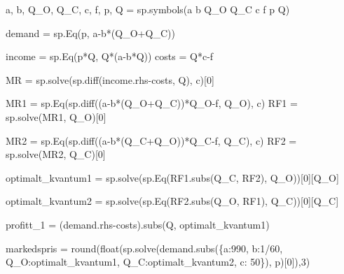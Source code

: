 \documentclass[
  12pt,
  a4paper,
  DIV=11,
  numbers=noendperiod]{scrartcl}
\newenvironment{Shaded}{\begin{snugshade}}{\end{snugshade}}
\newcommand{\BuiltInTok}[1]{\textcolor[rgb]{0.00,0.23,0.31}{#1}}
\newcommand{\DecValTok}[1]{\textcolor[rgb]{0.68,0.00,0.00}{#1}}
\newcommand{\NormalTok}[1]{\textcolor[rgb]{0.00,0.23,0.31}{#1}}
\newcommand{\OperatorTok}[1]{\textcolor[rgb]{0.37,0.37,0.37}{#1}}
\newcommand{\StringTok}[1]{\textcolor[rgb]{0.13,0.47,0.30}{#1}}
\begin{document}
\begin{Shaded}
\begin{Highlighting}[]
\NormalTok{a, b, Q\_O, Q\_C, c, f, p, Q }\OperatorTok{=}\NormalTok{ sp.symbols(}\StringTok{\textquotesingle{}a b Q\_O Q\_C c f p Q\textquotesingle{}}\NormalTok{)}

\NormalTok{demand }\OperatorTok{=}\NormalTok{ sp.Eq(p, a}\OperatorTok{{-}}\NormalTok{b}\OperatorTok{*}\NormalTok{(Q\_O}\OperatorTok{+}\NormalTok{Q\_C))}

\NormalTok{income }\OperatorTok{=}\NormalTok{ sp.Eq(p}\OperatorTok{*}\NormalTok{Q, Q}\OperatorTok{*}\NormalTok{(a}\OperatorTok{{-}}\NormalTok{b}\OperatorTok{*}\NormalTok{Q))}
\NormalTok{costs }\OperatorTok{=}\NormalTok{ Q}\OperatorTok{*}\NormalTok{c}\OperatorTok{{-}}\NormalTok{f}

\NormalTok{MR }\OperatorTok{=}\NormalTok{ sp.solve(sp.diff(income.rhs}\OperatorTok{{-}}\NormalTok{costs, Q), c)[}\DecValTok{0}\NormalTok{]}

\NormalTok{MR1 }\OperatorTok{=}\NormalTok{ sp.Eq(sp.diff((a}\OperatorTok{{-}}\NormalTok{b}\OperatorTok{*}\NormalTok{(Q\_O}\OperatorTok{+}\NormalTok{Q\_C))}\OperatorTok{*}\NormalTok{Q\_O}\OperatorTok{{-}}\NormalTok{f, Q\_O), c)}
\NormalTok{RF1  }\OperatorTok{=}\NormalTok{ sp.solve(MR1, Q\_O)[}\DecValTok{0}\NormalTok{]}

\NormalTok{MR2 }\OperatorTok{=}\NormalTok{ sp.Eq(sp.diff((a}\OperatorTok{{-}}\NormalTok{b}\OperatorTok{*}\NormalTok{(Q\_C}\OperatorTok{+}\NormalTok{Q\_O))}\OperatorTok{*}\NormalTok{Q\_C}\OperatorTok{{-}}\NormalTok{f, Q\_C), c)}
\NormalTok{RF2 }\OperatorTok{=}\NormalTok{ sp.solve(MR2, Q\_C)[}\DecValTok{0}\NormalTok{]}


\NormalTok{optimalt\_kvantum1 }\OperatorTok{=}\NormalTok{ sp.solve(sp.Eq(RF1.subs(Q\_C, RF2), Q\_O))[}\DecValTok{0}\NormalTok{][Q\_O]}

\NormalTok{optimalt\_kvantum2 }\OperatorTok{=}\NormalTok{ sp.solve(sp.Eq(RF2.subs(Q\_O, RF1), Q\_C))[}\DecValTok{0}\NormalTok{][Q\_C]}

\NormalTok{profitt\_1 }\OperatorTok{=}\NormalTok{ (demand.rhs}\OperatorTok{{-}}\NormalTok{costs).subs(Q, optimalt\_kvantum1)}


\NormalTok{markedspris }\OperatorTok{=} \BuiltInTok{round}\NormalTok{(}\BuiltInTok{float}\NormalTok{(sp.solve(demand.subs(\{a:}\DecValTok{990}\NormalTok{, b:}\DecValTok{1}\OperatorTok{/}\DecValTok{60}\NormalTok{, Q\_O:optimalt\_kvantum1, Q\_C:optimalt\_kvantum2, c: }\DecValTok{50}\NormalTok{\}), p)[}\DecValTok{0}\NormalTok{]),}\DecValTok{3}\NormalTok{)}


\end{Highlighting}
\end{Shaded}
\end{document}
